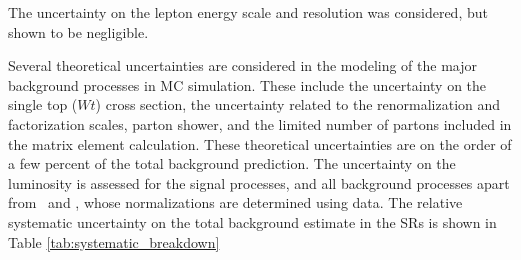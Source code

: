 The uncertainty on the lepton energy scale and resolution was considered,
but shown to be negligible.

Several theoretical uncertainties are considered in the modeling of the major
background processes in MC simulation. These include the uncertainty on the
single top ($Wt$) cross section, the uncertainty related to the renormalization
and factorization scales, parton shower, and the limited number of partons
included in the matrix element calculation. These theoretical uncertainties
are on the order of a few percent of the total background prediction. The
uncertainty on the luminosity is assessed for the signal processes, and all
background processes apart from \TTBAR\ and \ZGAMMAJETS, whose
normalizations are determined using data.
The relative systematic uncertainty on the total background estimate in the
SRs is shown in Table \ref{tab:systematic_breakdown}

\begin{table}[ht]
\caption{Summary of the effect of each considered sources of systematic
  uncertainty on the background estimate in SR~400 and SR~600. Several
  sources of theoretical systematic uncertainty which have a small
  effect on the total background estimate are grouped into the
  ``Other theory'' category.
}
\label{tab:systematic_breakdown}
%
\end{table}

